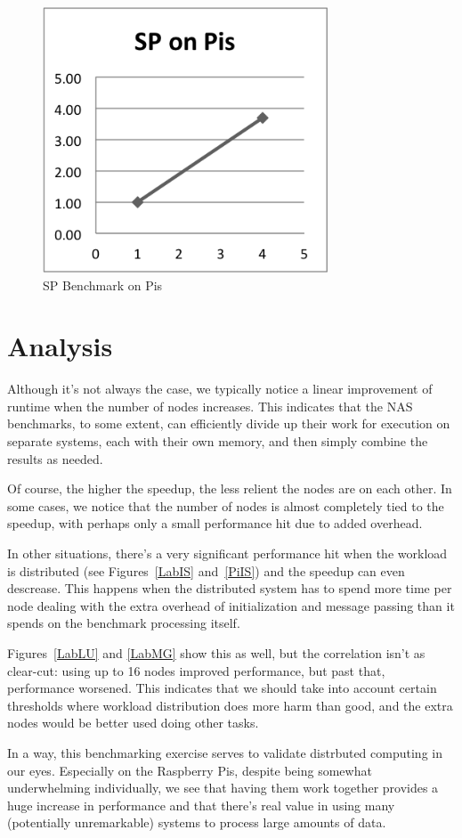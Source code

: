 \documentclass{acm_proc_article-sp}
\begin{document}
\begin{figure}[tbp]
  \centering
  \caption{SP Benchmark on Pis}
	\label{PiSP}
  \includegraphics[width=20pc]{Pics-Pi/SP.png}
\end{figure}

\section{Analysis}
Although it's not always the case, we typically notice a linear improvement of runtime when the number of nodes increases. This indicates that the NAS benchmarks, to some extent, can efficiently divide up their work for execution on separate systems, each with their own memory, and then simply combine the results as needed.

Of course, the higher the speedup, the less relient the nodes are on each other. In some cases, we notice that the number of nodes is almost completely tied to the speedup, with perhaps only a small performance hit due to added overhead.

In other situations, there's a very significant performance hit when the workload is distributed (see Figures~\ref{LabIS} and~\ref{PiIS}) and the speedup can even descrease. This happens when the distributed system has to spend more time per node dealing with the extra overhead of initialization and message passing than it spends on the benchmark processing itself.

Figures~\ref{LabLU} and \ref{LabMG} show this as well, but the correlation isn't as clear-cut: using up to 16 nodes improved performance, but past that, performance worsened. This indicates that we should take into account certain thresholds where workload distribution does more harm than good, and the extra nodes would be better used doing other tasks.

In a way, this benchmarking exercise serves to validate distrbuted computing in our eyes. Especially on the Raspberry Pis, despite being somewhat underwhelming individually, we see that having them work together provides a huge increase in performance and that there's real value in using many (potentially unremarkable) systems to process large amounts of data.


%

\end{document}
